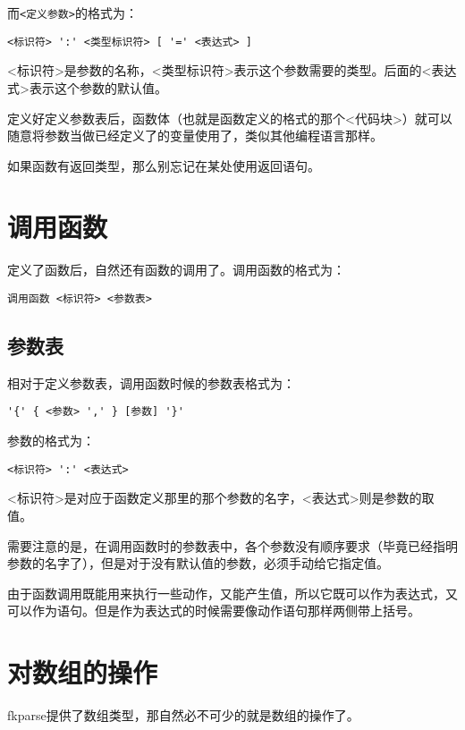 而\verb|<定义参数>|的格式为：

\begin{verbatim}
<标识符> ':' <类型标识符> [ '=' <表达式> ]
\end{verbatim}

<标识符>是参数的名称，<类型标识符>表示这个参数需要的类型。后面的<表达式>表示这个参数的默认值。

定义好定义参数表后，函数体（也就是函数定义的格式的那个<代码块>）就可以随意将参数当做已经定义了的变量使用了，类似其他编程语言那样。

如果函数有返回类型，那么别忘记在某处使用返回语句。

\section{调用函数}

定义了函数后，自然还有函数的调用了。调用函数的格式为：

\begin{verbatim}
调用函数 <标识符> <参数表>
\end{verbatim}

\subsection{参数表}

相对于定义参数表，调用函数时候的参数表格式为：

\begin{verbatim}
'{' { <参数> ',' } [参数] '}'
\end{verbatim}

参数的格式为：

\begin{verbatim}
<标识符> ':' <表达式>
\end{verbatim}

<标识符>是对应于函数定义那里的那个参数的名字，<表达式>则是参数的取值。

需要注意的是，在调用函数时的参数表中，各个参数没有顺序要求（毕竟已经指明参数的名字了），但是对于没有默认值的参数，必须手动给它指定值。

由于函数调用既能用来执行一些动作，又能产生值，所以它既可以作为表达式，又可以作为语句。但是作为表达式的时候需要像动作语句那样两侧带上括号。

\section{对数组的操作}

fkparse提供了数组类型，那自然必不可少的就是数组的操作了。

